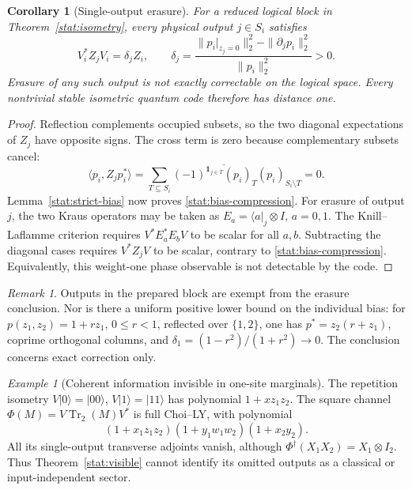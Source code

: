 \documentclass[reqno]{amsart}
\newtheorem{corollary}[theorem]{Corollary}
\theoremstyle{definition}
\theoremstyle{remark}
\newtheorem{remark}[theorem]{Remark}
\newtheorem{example}[theorem]{Example}
\DeclareMathOperator{\Tr}{Tr}
\begin{document}
\begin{corollary}[Single-output erasure]
\label{stat:no-code}
For a reduced logical block in Theorem~\ref{stat:isometry}, every
physical output \(j\in S_i\) satisfies
\begin{equation}
 V_i^*Z_jV_i=\delta_j Z_i,
 \qquad
 \delta_j=
 \frac{\|p_i|_{z_j=0}\|_2^2-\|\partial_jp_i\|_2^2}
      {\|p_i\|_2^2}>0.
 \label{stat:bias-compression}
\end{equation}
Erasure of any such output is not exactly correctable on the
logical space.  Every nontrivial stable isometric quantum code
therefore has distance one.
\end{corollary}

\begin{proof}
Reflection complements occupied subsets, so the two diagonal
expectations of \(Z_j\) have opposite signs.  The cross term is
zero because complementary subsets cancel:
\[
 \langle p_i,Z_jp_i^*\rangle
 =\overline{\sum_{T\subseteq S_i}
       (-1)^{\mathbf{1}_{j\in T}}(p_i)_T(p_i)_{S_i\setminus T}}=0.
\]
Lemma~\ref{stat:strict-bias} now proves
\eqref{stat:bias-compression}.  For erasure of output \(j\),
the two Kraus operators may be taken as
\(E_a=\langle a|_j\otimes I\), \(a=0,1\).
The Knill--Laflamme criterion \cite{KnillLaflamme97} requires
\(V^*E_a^*E_bV\) to be scalar for all \(a,b\).
Subtracting the diagonal cases requires \(V^*Z_jV\) to be scalar,
contrary to \eqref{stat:bias-compression}.  Equivalently, this
weight-one phase observable is not detectable by the code.
\end{proof}

\begin{remark}
Outputs in the prepared block are exempt from the erasure conclusion.
Nor is there a uniform positive lower bound on the individual bias:
for \(p(z_1,z_2)=1+r z_1\), \(0\le r<1\), reflected over
\(\{1,2\}\), one has \(p^*=z_2(r+z_1)\), coprime orthogonal
columns, and \(\delta_1=(1-r^2)/(1+r^2)\to0\).  The conclusion
concerns exact correction only.
\end{remark}

\begin{example}[Coherent information invisible in one-site marginals]
\label{stat:repetition}
The repetition isometry \(V|0\rangle=|00\rangle\),
\(V|1\rangle=|11\rangle\) has polynomial \(1+xz_1z_2\).
The square channel \(\Phi(M)=V\Tr_2(M)V^*\) is full Choi--LY,
with polynomial
\[
 (1+x_1z_1z_2)(1+y_1w_1w_2)(1+x_2y_2).
\]
All its single-output transverse adjoints vanish, although
\(\Phi^\dagger(X_1X_2)=X_1\otimes I_2\).
Thus Theorem~\ref{stat:visible} cannot identify its omitted
outputs as a classical or input-independent sector.
\end{example}
\end{document}
